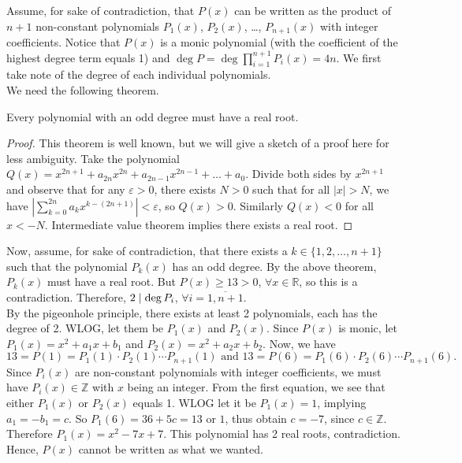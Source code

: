 \documentclass[11pt]{article}
\begin{document}
        \begin{solution}
            Assume, for sake of contradiction, that \(P(x)\) can be written as the product of \(n + 1\) non-constant polynomials \(P_1(x)\), \(P_2(x)\), \dots, \(P_{n+1}(x)\) with integer coefficients. Notice that \(P(x)\) is a monic polynomial (with the coefficient of the highest degree term equals 1) and \(\deg P = \deg \prod\limits_{i=1}^{n+1}P_i(x) = 4n\). We first take note of the degree of each individual polynomials.\\
            We need the following theorem.

            \begin{claim}
                Every polynomial with an odd degree must have a real root.
            \end{claim}

            \begin{proof}
                This theorem is well known, but we will give a sketch of a proof here for less ambiguity. Take the polynomial \(Q(x) = x^{2n+1} + a_{2n}x^{2n} + a_{2n-1}x^{2n-1} + \dots + a_0\). Divide both sides by \(x^{2n+1}\) and observe that for any \(\varepsilon > 0\), there exists \(N > 0\) such that for all \(\left|x\right| > N\), we have \(\left|\sum\limits_{k=0}^{2n} a_kx^{k-(2n+1)}\right| < \varepsilon\), so \(Q(x) > 0\). Similarly \(Q(x) < 0\) for all \(x < -N\). Intermediate value theorem implies there exists a real root.
            \end{proof}

            Now, assume, for sake of contradiction, that there exists a \(k \in \{1,2,\dots,n+1\}\) such that the polynomial \(P_k(x)\) has an odd degree. By the above theorem, \(P_k(x)\) must have a real root. But \(P(x) \geq 13 > 0\), \(\forall x \in \mathbb{R}\), so this is a contradiction. Therefore, \(2 \mid \deg P_i\), \(\forall i = \overline{1,n+1}\).\\
            By the pigeonhole principle, there exists at least 2 polynomials, each has the degree of 2. WLOG, let them be \(P_1(x)\) and \(P_2(x)\). Since \(P(x)\) is monic, let \(P_1(x) = x^2 + a_1x + b_1\) and \(P_2(x) = x^2 + a_2x + b_2\). Now, we have
            \[13 = P(1) = P_1(1) \cdot P_2(1) \cdots P_{n+1}(1) \text{ \ and \ } 13 = P(6) = P_1(6) \cdot P_2(6) \cdots P_{n+1}(6).\]
            Since \(P_i(x)\) are non-constant polynomials with integer coefficients, we must have \(P_i(x) \in \mathbb{Z}\) with \(x\) being an integer. From the first equation, we see that either \(P_1(x)\) or \(P_2(x)\) equals 1. WLOG let it be \(P_1(x) = 1\), implying \(a_1 = -b_1 = c\). So \(P_1(6) = 36 + 5c = 13\) or \(1\), thus obtain \(c = -7\), since \(c \in \mathbb{Z}\). Therefore \(P_1(x) = x^2 - 7x + 7\). This polynomial has 2 real roots, contradiction.\\
            Hence, \(P(x)\) cannot be written as what we wanted.
        \end{solution}
\end{document}
